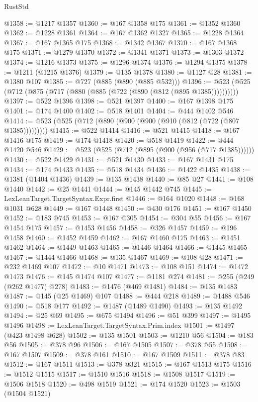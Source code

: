 \begin{lexlean}{RustStd}
\begin{coremodule}
@1358 := @1217 @1357
@1360 := @167 @1358 @175
@1361 := @1352 @1360
@1362 := @1228 @1361
@1364 := @167 @1362 @1327
@1365 := @1228 @1364
@1367 := @167 @1365 @175
@1368 := @1342 @1367
@1370 := @167 @1368 @175
@1371 := @1279 @1370
@1372 := @1341 @1371
@1373 := @1303 @1372
@1374 := @1216 @1373
@1375 := @1296 @1374
@1376 := @1294 @1375
@1378 := @1211 (@1215 @1376)
@1379 := @135 @1378
@1380 := @1127 @28
@1381 := @1380 @107
@1385 := @727 (@885 (@890 (@885 @532)))
@1396 := @523 (@525 (@712 (@875 (@717 (@880 (@885 (@722 (@890 (@812 (@895 @1385))))))))))
@1397 := @522 @1396
@1398 := @521 @1397
@1400 := @167 @1398 @175
@1401 := @174 @1400
@1402 := @518 @1401
@1404 := @444 @1402 @546
@1414 := @523 (@525 (@712 (@890 (@900 (@900 (@910 (@812 (@722 (@807 @1385)))))))))
@1415 := @522 @1414
@1416 := @521 @1415
@1418 := @167 @1416 @175
@1419 := @174 @1418
@1420 := @518 @1419
@1422 := @444 @1420 @546
@1429 := @523 (@525 (@712 (@895 (@900 (@956 (@717 @1385))))))
@1430 := @522 @1429
@1431 := @521 @1430
@1433 := @167 @1431 @175
@1434 := @174 @1433
@1435 := @518 @1434
@1436 := @1422 @1435
@1438 := @1381 (@1404 @1436)
@1439 := @135 @1438
@1440 := @85 @27
@1441 := @108 @1440
@1442 := @25 @1441
@1444 := @145 @1442 @745
@1445 := LexLeanTarget.TargetSyntax.Expr.first
@1446 := @164 @1020
@1448 := @168 @1031 @628
@1449 := @167 @1448
@1450 := @430 @176
@1451 := @167 @1450
@1452 := @183 @745
@1453 := @167 @305
@1454 := @304 @55
@1456 := @167 @1454 @175
@1457 := @1453 @1456
@1458 := @326 @1457
@1459 := @196 @1458
@1460 := @1452 @1459
@1462 := @167 @1460 @175
@1463 := @1451 @1462
@1464 := @1449 @1463
@1465 := @1446 @1464
@1466 := @1445 @1465
@1467 := @1444 @1466
@1468 := @135 @1467
@1469 := @108 @28
@1471 := @232 @1469 @107
@1472 := @10 @1471
@1473 := @108 @151
@1474 := @1472 @1473
@1476 := @145 @1474 @107
@1477 := @1181 @274
@1481 := @255 (@249 (@262 @1477) @278)
@1483 := @1476 (@469 @1481)
@1484 := @135 @1483
@1487 := @145 (@25 @1469) @107
@1488 := @444 @218
@1489 := @1488 @546
@1490 := @518 @177
@1492 := @1487 (@1489 @1490)
@1493 := @135 @1492
@1494 := @25 @69
@1495 := @675 @1494
@1496 := @51 @399
@1497 := @1495 @1496
@1498 := LexLeanTarget.TargetSyntax.Prim.index
@1501 := @1497 (@423 @1498 @628)
@1502 := @135 @1501
@1503 := @1210 @56
@1504 := @183 @56
@1505 := @378 @96
@1506 := @167 @1505
@1507 := @378 @55
@1508 := @167 @1507
@1509 := @378 @161
@1510 := @167 @1509
@1511 := @378 @83
@1512 := @167 @1511
@1513 := @378 @321
@1515 := @167 @1513 @175
@1516 := @1512 @1515
@1517 := @1510 @1516
@1518 := @1508 @1517
@1519 := @1506 @1518
@1520 := @498 @1519
@1521 := @174 @1520
@1523 := @1503 (@1504 @1521)

\end{coremodule}
\end{lexlean}
